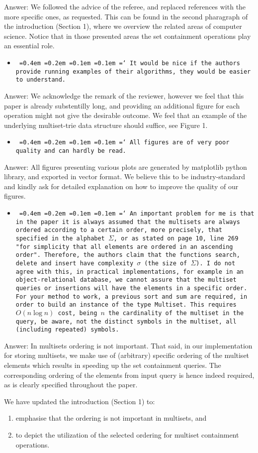 \documentclass[11pt,a4paper]{article}
\newcommand*\justify{%
  \fontdimen2\font=0.4em%
  \fontdimen3\font=0.2em%
  \fontdimen4\font=0.1em%
  \fontdimen7\font=0.1em%
  \hyphenchar\font=`\-%
}
\newcommand{\comment}[1]{\begin{itemize}
    \item {\tt\justify #1}
\end{itemize}}
\newcommand{\answer}[1]{{\sc Answer:} #1}
\begin{document}
\answer{
We followed the advice of the referee, and replaced references with the more specific ones, as requested.
This can be found in the second pharagraph of the introduction (Section 1), where we overview the related areas of computer science.
Notice that in those presented areas the set containment operations play an essential role.}


\comment{It would be nice if the authors provide running examples of their algorithms, they would be easier to understand.}

\answer{
We acknowledge the remark of the reviewer, however we feel that this paper is already substentilly long, and providing an additional figure for each operation might not give the desirable outcome.
We feel that an example of the underlying multiset-trie data structure should suffice, see Figure 1.}

\comment{All figures are of very poor quality and can hardly be read.}


\answer{All figures presenting various plots are generated by matplotlib python library, and exported in vector format.
We believe this to be industry-standard and kindly ask for detailed explanation on how to improve the quality of our figures.
}

\comment{An important problem for me is that in the paper it is always assumed that the multisets are always ordered according to a certain order, more precisely, that specified in the alphabet $\Sigma$, or as stated on page 10, line 269 "for simplicity that all elements are ordered in an ascending order". Therefore, the authors claim that the functions search, delete and insert have complexity $\sigma$ (the size of $\Sigma$). I do not agree with this, in practical implementations, for example in an object-relational database, we cannot assure that the multiset queries or insertions will have the elements in a specific order. For your method to work, a previous sort and sum are required, in order to build an instance of the type Multiset. This requires $O(n \log n)$ cost, being $n$ the cardinality of the multiset in the query, be aware, not the distinct symbols in the multiset, all (including repeated) symbols.}

\answer{In multisets ordering is not important.
That said, in our implementation for storing multisets,  we make use of (arbitrary) specific ordering of the multiset elements which results in speeding up the set containment queries.
The corresponding ordering of the elements from input query is  hence indeed required, as is clearly specified throughout the paper. 

We have updated the introduction (Section 1) to:
\begin{enumerate}[nosep]
	\item emphasise that the ordering is not important in multisets, and
 	\item  to depict the utilization of the selected ordering for multiset containment operations.
\end{enumerate}
}
\end{document}
